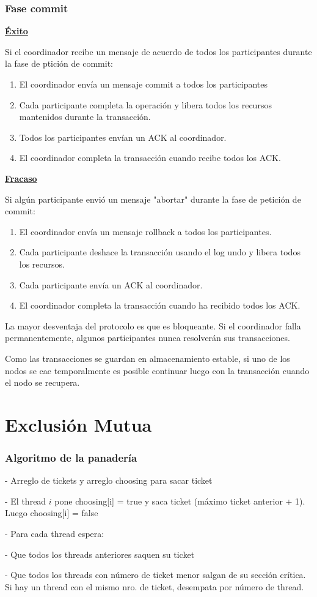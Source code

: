 \subsubsection{Fase commit}
\underline{\textbf{Éxito}}

Si el coordinador recibe un mensaje de acuerdo de todos los participantes durante la fase de ptición de commit:

\begin{enumerate}[1]
\item El coordinador envía un mensaje commit a todos los participantes
\item Cada participante completa la operación y libera todos los recursos mantenidos durante la transacción.
\item Todos los participantes envían un ACK al coordinador.
\item El coordinador completa la transacción cuando recibe todos los ACK.
\end{enumerate}

\underline{\textbf{Fracaso}}

Si algún participante envió un mensaje "abortar" durante la fase de petición de commit:

\begin{enumerate}[1]
\item El coordinador envía un mensaje rollback a todos los participantes.
\item Cada participante deshace la transacción usando el log undo y libera todos los recursos.
\item Cada participante envía un ACK al coordinador.
\item El coordinador completa la transacción cuando ha recibido todos los ACK.
\end{enumerate}


La mayor desventaja del protocolo es que es bloqueante. Si el coordinador falla permanentemente, algunos participantes nunca resolverán sus transacciones.

Como las transacciones se guardan en almacenamiento estable, si uno de los nodos se cae temporalmente es posible continuar luego con la transacción cuando el nodo se recupera.


\section{Exclusión Mutua}
\subsubsection{Algoritmo de la panadería}

- Arreglo de tickets y arreglo choosing para sacar ticket

- El thread $i$ pone choosing[i] = true y saca ticket (máximo ticket anterior + 1). Luego choosing[i] = false

- Para cada thread espera:

\quad - Que todos los threads anteriores saquen su ticket

\quad - Que todos los threads con número de ticket menor salgan de su sección crítica. Si hay un thread con el mismo nro. de ticket, desempata por número de thread. 
